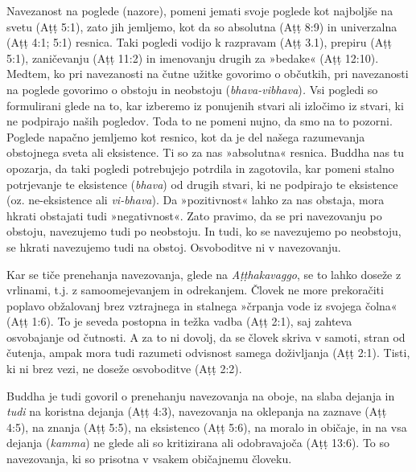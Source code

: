 Navezanost na poglede (nazore), pomeni jemati svoje poglede kot
najboljše na svetu (Aṭṭ 5:1), zato jih jemljemo, kot da so absolutna
(Aṭṭ 8:9) in univerzalna (Aṭṭ 4:1; 5:1) resnica. Taki pogledi vodijo k
razpravam (Aṭṭ 3.1), prepiru (Aṭṭ 5:1), zaničevanju (Aṭṭ 11:2) in
imenovanju drugih za »bedake« (Aṭṭ 12:10). Medtem, ko pri navezanosti na
čutne užitke govorimo o občutkih, pri navezanosti na poglede govorimo o
obstoju in neobstoju (\emph{bhava-vibhava})\emph{.} Vsi pogledi so
formulirani glede na to, kar izberemo iz ponujenih stvari ali izločimo
iz stvari, ki ne podpirajo naših pogledov. Toda to ne pomeni nujno, da
smo na to pozorni. Poglede napačno jemljemo kot resnico, kot da je del
našega razumevanja obstojnega sveta ali eksistence. Ti so za nas
»absolutna« resnica. Buddha nas tu opozarja, da taki pogledi potrebujejo
potrdila in zagotovila, kar pomeni stalno potrjevanje te eksistence
(\emph{bhava}) od drugih stvari, ki ne podpirajo te eksistence (oz.
ne-eksistence ali \emph{vi-bhava}). Da »pozitivnost« lahko za nas
obstaja, mora hkrati obstajati tudi »negativnost«. Zato pravimo, da se
pri navezovanju po obstoju, navezujemo tudi po neobstoju. In tudi, ko se
navezujemo po neobstoju, se hkrati navezujemo tudi na obstoj.
Osvoboditve ni v navezovanju.

Kar se tiče prenehanja navezovanja, glede na \emph{Aṭṭhakavaggo}, se
to lahko doseže z vrlinami, t.j. z samoomejevanjem in odrekanjem. Človek
ne more prekoračiti poplavo obžalovanj brez vztrajnega in stalnega
»črpanja vode iz svojega čolna« (Aṭṭ 1:6). To je seveda postopna in
težka vadba (Aṭṭ 2:1), saj zahteva osvobajanje od čutnosti. A za to ni
dovolj, da se človek skriva v samoti, stran od čutenja, ampak mora tudi
razumeti odvisnost samega doživljanja (Aṭṭ 2:1). Tisti, ki ni brez vezi,
ne doseže osvoboditve (Aṭṭ 2:2).

Buddha je tudi govoril o prenehanju navezovanja na oboje, na slaba
dejanja in \emph{tudi} na koristna dejanja (Aṭṭ 4:3), navezovanja na
oklepanja na zaznave (Aṭṭ 4:5), na znanja (Aṭṭ 5:5), na eksistenco (Aṭṭ
5:6), na moralo in običaje, in na vsa dejanja (\emph{kamma}) ne glede
ali so kritizirana ali odobravajoča (Aṭṭ 13:6). To so navezovanja, ki so
prisotna v vsakem običajnemu človeku.

